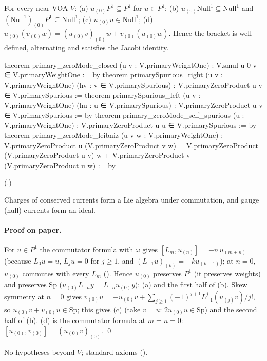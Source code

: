 \begin{theorem}\label{ch18:thm:primarylie}
For every near-VOA $V$: (a) $u_{(0)}P^1\subseteq P^1$ for $u\in P^1$; (b) $u_{(0)}\mathrm{Null}^1\subseteq\mathrm{Null}^1$ and $(\mathrm{Null}^1)_{(0)}P^1\subseteq\mathrm{Null}^1$;
(c) $u_{(0)}u\in\mathrm{Null}^1$; (d) $u_{(0)}(v_{(0)}w)=(u_{(0)}v)_{(0)}w+v_{(0)}(u_{(0)}w)$.  Hence the bracket is well defined,
alternating and satisfies the Jacobi identity.
\end{theorem}
\begin{leancode}
theorem primary_zeroMode_closed (u v : V.primaryWeightOne) :
    V.smul u 0 v ∈ V.primaryWeightOne := by
theorem primarySpurious_right (u v : V.primaryWeightOne) (hv : v ∈ V.primarySpurious) :
    V.primaryZeroProduct u v ∈ V.primarySpurious :=
theorem primarySpurious_left (u v : V.primaryWeightOne) (hu : u ∈ V.primarySpurious) :
    V.primaryZeroProduct u v ∈ V.primarySpurious := by
theorem primary_zeroMode_self_spurious (u : V.primaryWeightOne) :
    V.primaryZeroProduct u u ∈ V.primarySpurious := by
theorem primary_zeroMode_leibniz (u v w : V.primaryWeightOne) :
    V.primaryZeroProduct u (V.primaryZeroProduct v w) =
      V.primaryZeroProduct (V.primaryZeroProduct u v) w +
        V.primaryZeroProduct v (V.primaryZeroProduct u w) := by
\end{leancode}
(.)
\begin{physics}
Charges of conserved currents form a Lie algebra under commutation, and gauge (null) currents form an
ideal.
\end{physics}
\paragraph{Proof on paper.}  For $u\in P^1$ the commutator formula with $\omega$ gives
$[L_m,u_{(n)}]=-n\,u_{(m+n)}$ (because $L_0u=u$, $L_ju=0$ for $j\ge1$, and $(L_{-1}u)_{(k)}=-ku_{(k-1)}$); at
$n=0$, $u_{(0)}$ commutes with every $L_m$ ().  Hence $u_{(0)}$ preserves $P^1$
(it preserves weights) and preserves $\mathrm{Sp}$ ($u_{(0)}L_{-n}y=L_{-n}u_{(0)}y$): (a) and the first half of (b).  Skew
symmetry at $n=0$ gives $v_{(0)}u=-u_{(0)}v+\sum_{j\ge1}(-1)^{j+1}L_{-1}^j(u_{(j)}v)/j!$, so
$u_{(0)}v+v_{(0)}u\in\mathrm{Sp}$; this gives (c) (take $v=u$: $2u_{(0)}u\in\mathrm{Sp}$) and the second half of (b).  (d) is the
commutator formula at $m=n=0$: $[u_{(0)},v_{(0)}]=(u_{(0)}v)_{(0)}$. \qed
\begin{status}No hypotheses beyond $V$; standard axioms ().\end{status}

